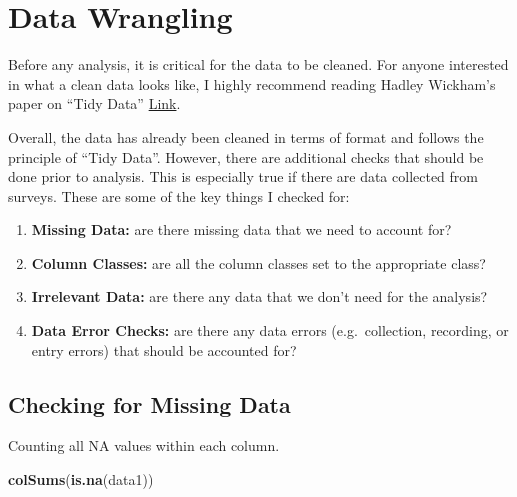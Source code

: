\documentclass[
]{article}
\newenvironment{Shaded}{\begin{snugshade}}{\end{snugshade}}
\newcommand{\KeywordTok}[1]{\textcolor[rgb]{0.13,0.29,0.53}{\textbf{#1}}}
\newcommand{\NormalTok}[1]{#1}
\providecommand{\tightlist}{%
  \setlength{\itemsep}{0pt}\setlength{\parskip}{0pt}}
\begin{document}
\hypertarget{data-wrangling}{%
\section{Data Wrangling}\label{data-wrangling}}

Before any analysis, it is critical for the data to be cleaned. For
anyone interested in what a clean data looks like, I highly recommend
reading Hadley Wickham's paper on ``Tidy Data''
\href{https://vita.had.co.nz/papers/tidy-data.pdf}{Link}.

Overall, the data has already been cleaned in terms of format and
follows the principle of ``Tidy Data''. However, there are additional
checks that should be done prior to analysis. This is especially true if
there are data collected from surveys. These are some of the key things
I checked for:

\begin{enumerate}
\def\labelenumi{\arabic{enumi}.}
\tightlist
\item
  \textbf{Missing Data:} are there missing data that we need to account
  for?
\item
  \textbf{Column Classes:} are all the column classes set to the
  appropriate class?
\item
  \textbf{Irrelevant Data:} are there any data that we don't need for
  the analysis?
\item
  \textbf{Data Error Checks:} are there any data errors
  (e.g.~collection, recording, or entry errors) that should be accounted
  for?
\end{enumerate}

\hypertarget{checking-for-missing-data}{%
\subsection{Checking for Missing Data}\label{checking-for-missing-data}}

Counting all NA values within each column.

\begin{Shaded}
\begin{Highlighting}[]
\KeywordTok{colSums}\NormalTok{(}\KeywordTok{is.na}\NormalTok{(data1))}
\end{Highlighting}
\end{Shaded}
\end{document}
